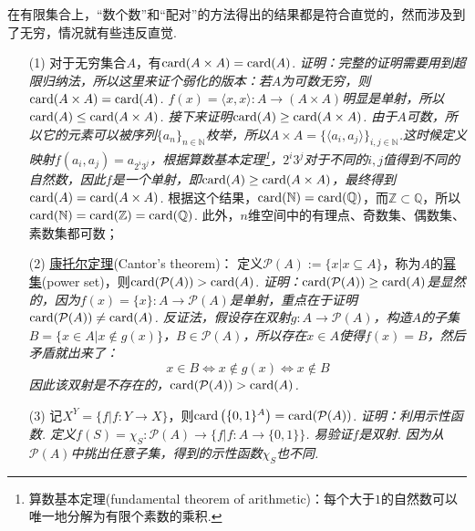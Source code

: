 \documentclass[main.tex]{subfiles}
\begin{document}
在有限集合上，“数个数”和“配对”的方法得出的结果都是符合直觉的，然而涉及到了无穷，情况就有些违反直觉.
\begin{itemize}
    \item [(1)] 对于无穷集合\(A\)，有\({\rm card}(A \times A) = {\rm card}(A)\).
    \newline
    \textit{
        证明：完整的证明需要用到超限归纳法，所以这里来证个弱化的版本：若\(A\)为可数无穷，则\({\rm card}(A \times A) = {\rm card}(A)\).
        \newline
        \(f(x) = \langle x, x \rangle: A \to (A \times A)\)明显是单射，所以\({\rm card}(A) \leq {\rm card}(A \times A)\). 接下来证明\({\rm card}(A) \geq {\rm card}(A \times A)\). 由于\(A\)可数，所以它的元素可以被序列\(\{a_n\}_{n \in \mathbb{N}}\)枚举，所以\(A \times A = \{\langle a_i, a_j \rangle\}_{i,j \in \mathbb{N}}\).这时候定义映射\(f(a_i,a_j) = a_{2^i 3^j}\)，根据算数基本定理\footnote{算数基本定理(fundamental theorem of arithmetic)：每个大于\(1\)的自然数可以唯一地分解为有限个素数的乘积.}，\(2^i3^j\)对于不同的\(i,j\)值得到不同的自然数，因此\(f\)是一个单射，即\({\rm card}(A) \geq {\rm card}(A \times A)\)，最终得到\({\rm card}(A) = {\rm card}(A \times A)\).
    }
    根据这个结果，\({\rm card}(\mathbb{N})={\rm card}(\mathbb{Q})\)，而\(\mathbb{Z} \subset \mathbb{Q}\)，所以\({\rm card}(\mathbb{N})={\rm card}(\mathbb{Z})={\rm card}(\mathbb{Q})\). 此外，\(n\)维空间中的有理点、奇数集、偶数集、素数集都可数；

    \item [(2)] \uline{康托尔定理}(Cantor's theorem)：
    \newline
    定义\(\mathcal{P}(A):=\{x | x \subseteq A\}\)，称为\(A\)的\uline{幂集}(power set)，则\({\rm card}(\mathcal{P}(A)) > {\rm card}(A)\).
    \newline
    \textit{
        证明：\({\rm card}(\mathcal{P}(A)) \geq {\rm card}(A)\)是显然的，因为\(f(x)=\{x\}: A \to \mathcal{P}(A)\)是单射，重点在于证明\({\rm card}(\mathcal{P}(A)) \neq {\rm card}(A)\). 反证法，假设存在双射\(g:A \to \mathcal{P}(A)\)，构造\(A\)的子集\(B=\{x \in A | x \not \in g(x)\}\)，\(B \in \mathcal{P}(A)\)，所以存在\(x \in A\)使得\(f(x)=B\)，然后矛盾就出来了：
        \[x \in B \Longleftrightarrow x \not \in g(x) \Longleftrightarrow x \not \in B\]
        因此该双射是不存在的，\({\rm card}(\mathcal{P}(A)) > {\rm card}(A)\).
    }

    \item [(3)] 记\(X^Y=\{f|f:Y \to X\}\)，则\({\rm card}\left(\{0,1\}^A\right) = {\rm card}(\mathcal{P}(A))\).
    \newline
    \textit{
        证明：利用示性函数. 定义\(f(S) = \chi_S:\mathcal{P}(A) \to \{f | f: A \to \{0,1\}\}\). 易验证\(f\)是双射. 因为从\(\mathcal{P}(A)\)中挑出任意子集，得到的示性函数\(\chi_S\)也不同.
    }


\end{itemize}
\end{document}
